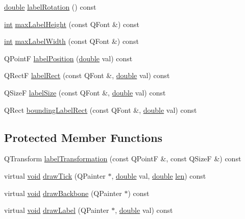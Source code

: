 \begin{DoxyCompactItemize}
\item 
\hyperlink{_super_l_u_support_8h_a8956b2b9f49bf918deed98379d159ca7}{double} \hyperlink{class_qwt_scale_draw_a614f18b99f53e6a6282c39f95388face}{label\-Rotation} () const 
\item 
\hyperlink{ioapi_8h_a787fa3cf048117ba7123753c1e74fcd6}{int} \hyperlink{class_qwt_scale_draw_ab5fcdcbb4c3fe419e48efd3068ecd3e4}{max\-Label\-Height} (const Q\-Font \&) const 
\item 
\hyperlink{ioapi_8h_a787fa3cf048117ba7123753c1e74fcd6}{int} \hyperlink{class_qwt_scale_draw_ab0c4ee29e81cee70e8a491e5ff80b8ff}{max\-Label\-Width} (const Q\-Font \&) const 
\item 
Q\-Point\-F \hyperlink{class_qwt_scale_draw_af0993dc0226ca63a2994f48ef6198c48}{label\-Position} (\hyperlink{_super_l_u_support_8h_a8956b2b9f49bf918deed98379d159ca7}{double} val) const 
\item 
Q\-Rect\-F \hyperlink{class_qwt_scale_draw_a61ed70aef675f8694b4888f02c8ae83c}{label\-Rect} (const Q\-Font \&, \hyperlink{_super_l_u_support_8h_a8956b2b9f49bf918deed98379d159ca7}{double} val) const 
\item 
Q\-Size\-F \hyperlink{class_qwt_scale_draw_a49352345ab223395b7ff95c82b92c819}{label\-Size} (const Q\-Font \&, \hyperlink{_super_l_u_support_8h_a8956b2b9f49bf918deed98379d159ca7}{double} val) const 
\item 
Q\-Rect \hyperlink{class_qwt_scale_draw_a364846c2b4be817c9a645bd226cdd6e7}{bounding\-Label\-Rect} (const Q\-Font \&, \hyperlink{_super_l_u_support_8h_a8956b2b9f49bf918deed98379d159ca7}{double} val) const 
\end{DoxyCompactItemize}
\subsection*{Protected Member Functions}
\begin{DoxyCompactItemize}
\item 
Q\-Transform \hyperlink{class_qwt_scale_draw_a0efa1e4675c85b3187aa69220d135dc4}{label\-Transformation} (const Q\-Point\-F \&, const Q\-Size\-F \&) const 
\item 
virtual \hyperlink{group___u_a_v_objects_plugin_ga444cf2ff3f0ecbe028adce838d373f5c}{void} \hyperlink{class_qwt_scale_draw_a84badd947ddc95a462ec20fe64922b36}{draw\-Tick} (Q\-Painter $\ast$, \hyperlink{_super_l_u_support_8h_a8956b2b9f49bf918deed98379d159ca7}{double} val, \hyperlink{_super_l_u_support_8h_a8956b2b9f49bf918deed98379d159ca7}{double} \hyperlink{glext_8h_ac759c9f8b2506530e65879e566e59f02}{len}) const 
\item 
virtual \hyperlink{group___u_a_v_objects_plugin_ga444cf2ff3f0ecbe028adce838d373f5c}{void} \hyperlink{class_qwt_scale_draw_aa53015c17e2abb01b179473cc488f20c}{draw\-Backbone} (Q\-Painter $\ast$) const 
\item 
virtual \hyperlink{group___u_a_v_objects_plugin_ga444cf2ff3f0ecbe028adce838d373f5c}{void} \hyperlink{class_qwt_scale_draw_afc02a11a03efde4ea239d77c4d7711f4}{draw\-Label} (Q\-Painter $\ast$, \hyperlink{_super_l_u_support_8h_a8956b2b9f49bf918deed98379d159ca7}{double} val) const 
\end{DoxyCompactItemize}


